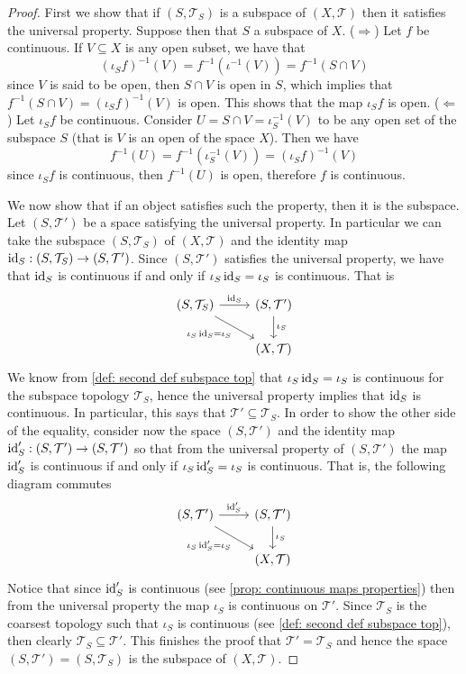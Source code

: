\begin{proof}
First we show that if \((S, \mathcal T_S)\) is a subspace of \((X, \mathcal{T})\) then
it satisfies the universal property. Suppose then that \(S\) a subspace of
\(X\). (\(\Rightarrow\)) Let \(f\) be continuous. If \(V \subseteq X\) is any open subset, we have
that
\[
  (\iota_S  f)^{-1}(V) = f^{-1}(\iota^{-1}(V)) = f^{-1}(S \cap V)
\]
since \(V\) is said to be open, then \(S \cap V\) is open in \(S\), which
implies that \(f^{-1}(S \cap V) = (\iota_S  f)^{-1}(V)\) is open. This
shows that the map \(\iota_S  f\) is open. (\(\Leftarrow\)) Let \(\iota_S
  f\) be continuous. Consider \(U = S \cap V = \iota_S^{-1}(V)\) to be any
open set of the subspace \(S\) (that is \(V\) is an open of the space \(X\)).
Then we have
\[
  f^{-1}(U) = f^{-1}(\iota_S^{-1}(V)) = (\iota_S  f)^{-1}(V)
\]
since \(\iota_S  f\) is continuous, then \(f^{-1}(U)\) is open, therefore
\(f\) is continuous.

We now show that if an object satisfies such the property, then it is the
subspace. Let \((S, \mathcal T')\) be a space satisfying the universal
property. In particular we can take the subspace \((S, \mathcal T_S)\) of
\((X, \mathcal T)\) and the identity map \(\operatorname{id}_S: (S, \mathcal T_S) \to (S,
\mathcal T')\). Since \((S, \mathcal T')\) satisfies the universal property,
we have that \(\operatorname{id}_S\) is continuous if and only if \(\iota_S  \operatorname{id}_S =
\iota_S\) is continuous. That is
\[
  \begin{tikzcd}
    (S, \mathcal T_S)
    \ar[r, "\Id_S"]
    \ar[rd, swap, "\iota_S  \Id_S = \iota_S"]
      &(S, \mathcal T') \ar[d, "\iota_S"] \\
      &(X, \mathcal T)
  \end{tikzcd}
\]
We know from \cref{def: second def subspace top} that \(\iota_S  \operatorname{id}_S =
\iota_S\) is continuous for the subspace topology \(\mathcal T_S\), hence the
universal property implies that \(\operatorname{id}_S\) is continuous. In particular, this
says that \(\mathcal T' \subseteq \mathcal T_S\). In order to show the other
side of the equality, consider now the space \((S, \mathcal T')\) and the
identity map \(\operatorname{id}_S': (S, \mathcal T') \to (S, \mathcal T')\) so that from the
universal property of \((S, \mathcal T')\) the map \(\operatorname{id}_S'\) is continuous if
and only if \(\iota_S  \operatorname{id}_S' = \iota_S\) is continuous. That is, the
following diagram commutes
\[
  \begin{tikzcd}
    (S, \mathcal T') \ar[r, "\Id_S'"]
    \ar[rd, swap, "\iota_S  \Id_S' = \iota_S"]
      &(S, \mathcal T') \ar[d, "\iota_S"] \\
      &(X, \mathcal T)
  \end{tikzcd}
\]
Notice that since \(\operatorname{id}_S'\) is continuous (see \cref{prop: continuous maps
properties}) then from the universal property the map \(\iota_S\) is
continuous on \(\mathcal T'\). Since \(\mathcal T_S\) is the coarsest topology
such that \(\iota_S\) is continuous (see \cref{def: second def subspace top}),
then clearly \(\mathcal T_S \subseteq \mathcal T'\). This finishes the proof
that \(\mathcal T' = \mathcal T_S\) and hence the space \((S, \mathcal T') =
(S, \mathcal T_S)\) is the subspace of \((X, \mathcal T)\).
\end{proof}

